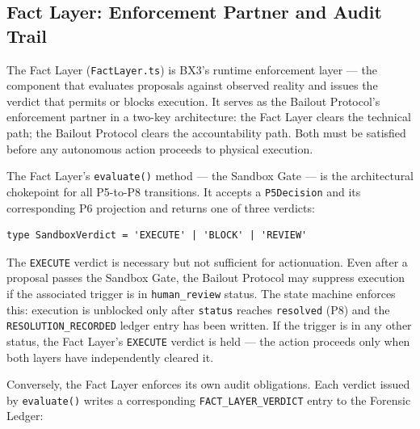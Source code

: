 \subsection{Fact Layer: Enforcement Partner and Audit Trail}

The Fact Layer (\texttt{FactLayer.ts}) is BX3's runtime enforcement layer ---
the component that evaluates proposals against observed reality and issues the
verdict that permits or blocks execution.  It serves as the Bailout Protocol's
enforcement partner in a two-key architecture: the Fact Layer clears the
technical path; the Bailout Protocol clears the accountability path.  Both
must be satisfied before any autonomous action proceeds to physical execution.

The Fact Layer's \texttt{evaluate()} method --- the Sandbox Gate ---
is the architectural chokepoint for all P5-to-P8 transitions.  It accepts a
\texttt{P5Decision} and its corresponding P6 projection and returns one of
three verdicts:

\begin{verbatim}
type SandboxVerdict = 'EXECUTE' | 'BLOCK' | 'REVIEW'
\end{verbatim}

The \texttt{EXECUTE} verdict is necessary but not sufficient for actionuation.
Even after a proposal passes the Sandbox Gate, the Bailout Protocol may suppress
execution if the associated trigger is in \texttt{human\_review} status.  The
state machine enforces this: execution is unblocked only after
\texttt{status} reaches \texttt{resolved} (P8) and the \texttt{RESOLUTION\_RECORDED}
ledger entry has been written.  If the trigger is in any other status, the Fact
Layer's \texttt{EXECUTE} verdict is held --- the action proceeds only when both
layers have independently cleared it.

Conversely, the Fact Layer enforces its own audit obligations.  Each
verdict issued by \texttt{evaluate()} writes a corresponding
\texttt{FACT\_LAYER\_VERDICT} entry to the Forensic Ledger:

